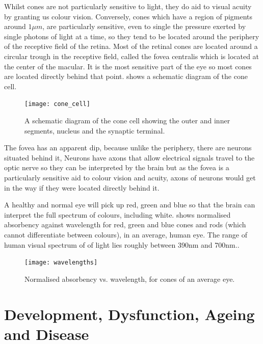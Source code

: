 Whilst cones are not particularly sensitive to light, they do aid to visual
acuity by granting us colour vision.\cite{bowmaker1980visual} Conversely, cones
which have a region of pigments around $1\mu{m}$, are particularly sensitive,
even to single the pressure exerted by single photons of light at a time,
so they tend to be located around the periphery of the receptive field of
the retina.\cite{liebman1964sensitive,baylor1979responses} 
Most of the retinal cones are located around a circular trough in the
receptive field, called the fovea centralis which is located at the center
of the macular.\cite{hendrickson1994primate} It is the most sensitive part
of the eye so most cones are located directly behind that point.
 shows a schematic diagram of the cone cell.

\begin{figure}[!htbp]
  \centering
    \texttt{[image: cone\_cell]}
  \caption{A schematic diagram of the cone cell showing the outer and inner segments, nucleus
  and the synaptic terminal.\cite{wikicone}}
  \label{fig:cone}
\end{figure}

The fovea has an apparent dip, because unlike the periphery,
there are neurons situated behind it, Neurons have axons that allow electrical
signals travel to the optic nerve so they can be interpreted by the brain but
as the fovea is a particularly sensitive aid to colour vision and acuity,
axons of neurons would get in the way if they were located directly behind it.

A healthy and normal eye will pick up red, green and blue so that the brain
can interpret the full spectrum of colours, including white. 
shows normalised absorbency against wavelength for red, green and blue cones
and rods (which cannot differentiate between colours), in an average, human eye.
The range of human visual spectrum of of light lies roughly between 390nm
and 700nm.\cite{starr2010biology}.

\begin{figure}[!htbp]
  \centering
    \texttt{[image: wavelengths]}
  \caption{Normalised absorbency vs. wavelength, for cones of an average eye.\cite{wikicones}}
  \label{fig:wavelengths}
\end{figure}

\section{Development, Dysfunction, Ageing and Disease}

